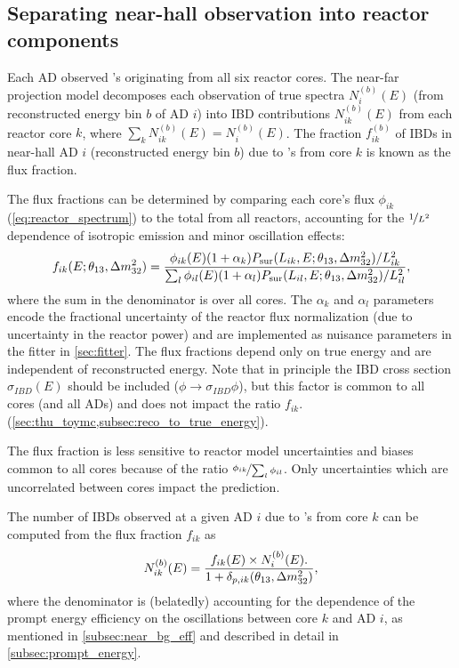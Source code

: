 \subsection{Separating near-hall observation into reactor components}
\label{subsec:flux_fraction}

Each AD observed \nuebar{}'s originating from all six reactor cores.
The near-far projection model decomposes each observation
of true \nuebar{} spectra $N_i^{(b)}(E)$
(from reconstructed energy bin $b$ of AD $i$)
into IBD contributions $N_{ik}^{(b)}(E)$ from each reactor core $k$,
where $\sum_k N_{ik}^{(b)}(E) = N_i^{(b)}(E)$.
The fraction $f_{ik}^{(b)}$ of IBDs in near-hall AD $i$
(reconstructed energy bin $b$)
due to \nuebar{}'s from core $k$ is known as the flux fraction.

The flux fractions can be determined
by comparing each core's \nuebar{} flux $\phi_{ik}$ (\cref{eq:reactor_spectrum})
to the total from all reactors,
accounting for the $\nicefrac{1}{L^2}$ dependence of isotropic \nuebar{} emission
and minor oscillation effects:
\begin{equation}\label{eq:flux_fraction}
    f_{ik}(E;\theta_{13},\Delta m^2_{32}) = \frac{
        \phi_{ik}(E)(1+\alpha_k) P_\text{sur} (L_{ik}, E;\theta_{13},\Delta m^2_{32})/L_{ik}^2
    }{
    \sum_l \phi_{il}(E)(1+\alpha_l)P_\text{sur}(L_{il}, E;\theta_{13},\Delta m^2_{32})/L_{il}^2
    },
\end{equation}
where the sum in the denominator is over all cores.
The $\alpha_k$ and $\alpha_l$ parameters
encode the fractional uncertainty of the reactor flux normalization
(due to uncertainty in the reactor power)
and are implemented as nuisance parameters in the fitter in \cref{sec:fitter}.
The flux fractions depend only on true \nuebar{} energy
and are independent of reconstructed energy.
Note that in principle the IBD cross section $\sigma_{IBD}(E)$
should be included ($\phi \to \sigma_{IBD}\phi$),
but this factor is common to all cores (and all ADs)
and does not impact the ratio $f_{ik}$.
(\cref{sec:thu_toymc,subsec:reco_to_true_energy}).

The flux fraction is less sensitive to reactor \nuebar{} model uncertainties and biases
common to all cores
because of the ratio $\nicefrac{\phi_{ik}}{\sum_l\phi_{il}}$.
Only uncertainties which are uncorrelated between cores
impact the prediction.

The number of IBDs observed at a given AD $i$ due to \nuebar{}'s from core $k$
can be computed from the flux fraction $f_{ik}$ as
\begin{equation}\label{eq:num_ibds_from_core_ij}
    N_{ik}^{(b)}(E) = \frac{
        f_{ik}(E) \times N_i^{(b)}(E).
    }{
        1 + \delta_{p,ik}(\theta_{13}, \Delta m^2_{32})
    },
\end{equation}
where the denominator is (belatedly) accounting for the dependence
of the prompt energy efficiency on the \nuebar{} oscillations
between core $k$ and AD $i$,
as mentioned in \cref{subsec:near_bg_eff}
and described in detail in \cref{subsec:prompt_energy}.


